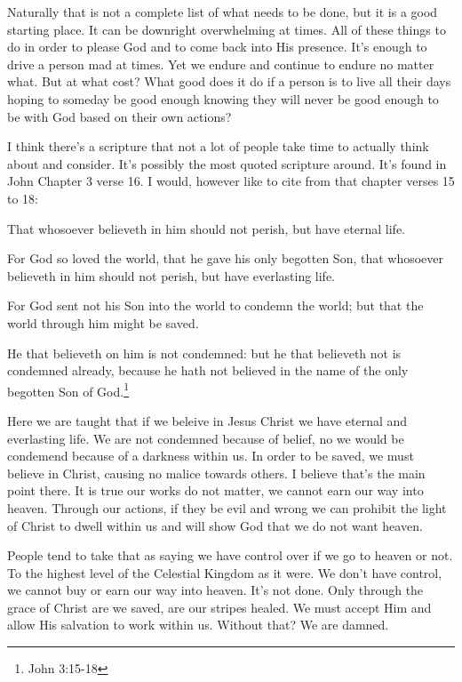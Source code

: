 Naturally that is not a complete list of what needs to be done, but it is a good
starting place. It can be downright overwhelming at times. All of these things to do
in order to please God and to come back into His presence. It's enough to drive a
person mad at times. Yet we endure and continue to endure no matter what. But at what
cost? What good does it do if a person is to live all their days hoping to someday be
good enough knowing they will never be good enough to be with God based on their own
actions?

I think there's a scripture that not a lot of people take time to actually think
about and consider. It's possibly the most quoted scripture around. It's found in
John Chapter 3 verse 16. I would, however like to cite from that chapter verses
15 to 18:

\begin{displayquote}
That whosoever believeth in him should not perish, but have eternal life.

For God so loved the world, that he gave his only begotten Son, that whosoever 
believeth in him should not perish, but have everlasting life.

For God sent not his Son into the world to condemn the world; but that the 
world through him might be saved.

He that believeth on him is not condemned: but he that believeth not is 
condemned already, because he hath not believed in the name of the only begotten 
Son of God.\footnote{John 3:15-18}
\end{displayquote}

Here we are taught that if we beleive in Jesus Christ we have eternal and everlasting
life. We are not condemned because of belief, no we would be condemend because of a
darkness within us. In order to be saved, we must believe in Christ, causing no
malice towards others. I believe that's the main point there. It is true our works do
not matter, we cannot earn our way into heaven. Through our actions, if they be evil
and wrong we can prohibit the light of Christ to dwell within us and will show God
that we do not want heaven.

People tend to take that as saying we have control over if we go to heaven or not. To
the highest level of the Celestial Kingdom as it were. We don't have control, we
cannot buy or earn our way into heaven. It's not done. Only through the grace of
Christ are we saved, are our stripes healed. We must accept Him and allow His
salvation to work within us. Without that? We are damned.
